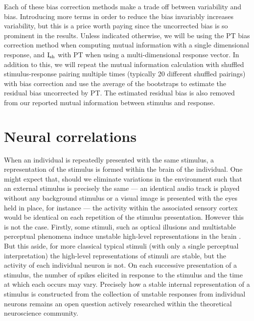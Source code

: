 Each of these bias correction methods make a trade off between variability and bias.
Introducing more terms in order to reduce the bias invariably increases variability, but this is a price worth paying since the uncorrected bias is so prominent in the results.
Unless indicated otherwise, we will be using the \ac{PT} bias correction method when computing mutual information with a single dimensional response, and $\operatorname{I}_{\text{sh}}$ with \ac{PT} when using a multi-dimensional response vector.
In addition to this, we will repeat the mutual information calculation with shuffled stimulus-response pairing multiple times (typically 20 different shuffled pairings) with bias correction and use the average of the bootstraps to estimate the residual bias uncorrected by \ac{PT}.
The estimated residual bias is also removed from our reported mutual information between stimulus and response.


\FloatBarrier
\section{Neural correlations}
\label{sec:bg-corr}

When an individual is repeatedly presented with the same stimulus, a representation of the stimulus is formed within the brain of the individual.
One might expect that, should we eliminate variations in the environment such that an external stimulus is precisely the same --- an identical audio track is played without any background stimulus or a visual image is presented with the eyes held in place, for instance --- the activity within the associated sensory cortex would be identical on each repetition of the stimulus presentation.
However this is not the case.
Firstly, some stimuli, such as optical illusions and multistable perceptual phenomena induce unstable high-level representations in the brain \citep{Lumer1998,Sterzer2009,Watanabe2014}.
But this aside, for more classical typical stimuli (with only a single perceptual interpretation) the high-level representations of stimuli are stable, but the activity of each individual neuron is not.
On each successive presentation of a stimulus, the number of spikes elicited in response to the stimulus and the time at which each occurs may vary.
Precisely how a stable internal representation of a stimulus is constructed from the collection of unstable responses from individual neurons remains an open question actively researched within the theoretical neuroscience community.

